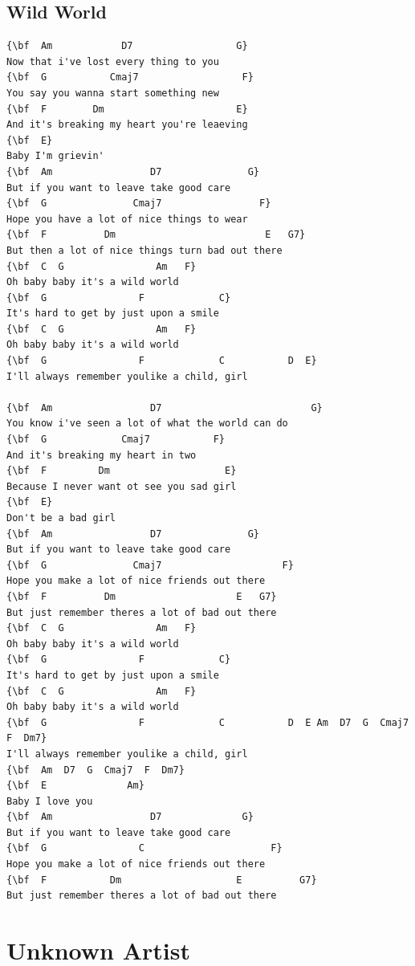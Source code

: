 \documentclass[a4paper]{article}
\begin{document}
\subsection{Wild World}
\begin{Verbatim}[commandchars=\\\{\}]
{\bf  Am            D7                  G}
Now that i've lost every thing to you
{\bf  G           Cmaj7                  F}
You say you wanna start something new
{\bf  F        Dm                       E}
And it's breaking my heart you're leaeving
{\bf  E}
Baby I'm grievin'
{\bf  Am                 D7               G}
But if you want to leave take good care
{\bf  G               Cmaj7                 F}
Hope you have a lot of nice things to wear
{\bf  F          Dm                          E   G7}
But then a lot of nice things turn bad out there
{\bf  C  G                Am   F}
Oh baby baby it's a wild world
{\bf  G                F             C}
It's hard to get by just upon a smile
{\bf  C  G                Am   F}
Oh baby baby it's a wild world
{\bf  G                F             C           D  E}
I'll always remember youlike a child, girl

{\bf  Am                 D7                          G}
You know i've seen a lot of what the world can do
{\bf  G             Cmaj7           F}
And it's breaking my heart in two
{\bf  F         Dm                    E}
Because I never want ot see you sad girl
{\bf  E}
Don't be a bad girl
{\bf  Am                 D7               G}
But if you want to leave take good care
{\bf  G               Cmaj7                     F}
Hope you make a lot of nice friends out there
{\bf  F          Dm                     E   G7}
But just remember theres a lot of bad out there
{\bf  C  G                Am   F}
Oh baby baby it's a wild world
{\bf  G                F             C}
It's hard to get by just upon a smile
{\bf  C  G                Am   F}
Oh baby baby it's a wild world
{\bf  G                F             C           D  E Am  D7  G  Cmaj7  F  Dm7}
I'll always remember youlike a child, girl
{\bf  Am  D7  G  Cmaj7  F  Dm7}
{\bf  E              Am}
Baby I love you
{\bf  Am                 D7              G}
But if you want to leave take good care
{\bf  G                C                      F}
Hope you make a lot of nice friends out there
{\bf  F           Dm                    E          G7}
But just remember theres a lot of bad out there

\end{Verbatim}
\newpage
\section{Unknown Artist}
\end{document}
